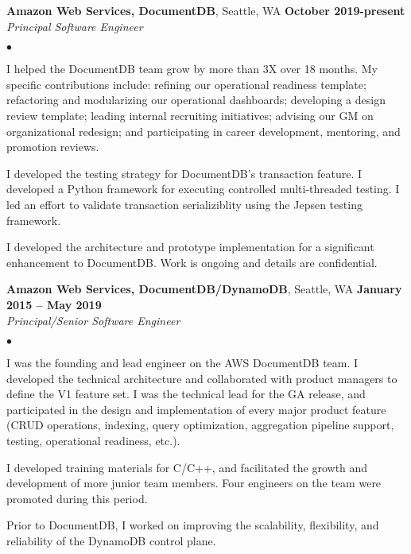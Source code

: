 \documentclass[margin,line]{res}
\newenvironment{list2}{
  \begin{list}{$\bullet$}{%
      \setlength{\itemsep}{0in}
      \setlength{\parsep}{0in} \setlength{\parskip}{0in}
      \setlength{\topsep}{0in} \setlength{\partopsep}{0in} 
      \setlength{\leftmargin}{0.2in}}}{\end{list}}
\begin{document}
\begin{resume}
\textbf{Amazon Web Services, DocumentDB}, Seattle, WA \hfill \textbf{October 2019-present} \\\vspace{-4mm}
\textsl{Principal Software Engineer} \\
\begin{list2}
\item I helped the DocumentDB team grow by more than 3X over 18 months.  My specific contributions include: refining our operational readiness template; refactoring and modularizing our operational
  dashboards; developing a design review template; leading internal recruiting initiatives;
  advising our GM on organizational redesign; 
  and participating in career development, mentoring, and promotion reviews.
\item I developed the testing strategy for DocumentDB's transaction feature.  I developed a
  Python framework for executing controlled multi-threaded testing.  I led an effort to validate
  transaction serializiblity using the Jepsen testing framework.
\item I developed the architecture and prototype implementation for a significant enhancement to
  DocumentDB.  Work is ongoing and details are confidential.
\end{list2}

\textbf{Amazon Web Services, DocumentDB/DynamoDB}, Seattle, WA \hfill \textbf{January 2015 -- May 2019} \\\vspace{-4mm}
\textsl{Principal/Senior Software Engineer} \\
\begin{list2}
  \item I was the founding and lead engineer on the AWS DocumentDB team.  I developed the technical 
    architecture and collaborated with product managers to define the V1 feature set.  I was the
    technical lead for the GA release, and participated in the design and implementation of every
    major product feature (CRUD operations, indexing, query optimization,
    aggregation pipeline support,
    testing, operational readiness, etc.).
  \item I developed training materials for C/C++, and facilitated the growth and development of
    more junior team members.  Four engineers on the team were promoted during this period.
  \item Prior to DocumentDB, I worked on improving the scalability, flexibility, and reliability
    of the DynamoDB control plane.
\end{list2}


\end{resume}
\end{document}
